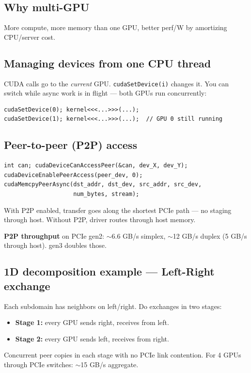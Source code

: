\documentclass[10pt]{article}
\begin{document}
\subsection*{Why multi-GPU}
More compute, more memory than one GPU, better perf/W by amortizing CPU/server cost.

\subsection*{Managing devices from one CPU thread}
CUDA calls go to the \emph{current} GPU. \texttt{cudaSetDevice(i)} changes it. You can switch while async work is in flight — both GPUs run concurrently:
\begin{lstlisting}
cudaSetDevice(0); kernel<<<...>>>(...);
cudaSetDevice(1); kernel<<<...>>>(...);  // GPU 0 still running
\end{lstlisting}

\subsection*{Peer-to-peer (P2P) access}
\begin{lstlisting}
int can; cudaDeviceCanAccessPeer(&can, dev_X, dev_Y);
cudaDeviceEnablePeerAccess(peer_dev, 0);
cudaMemcpyPeerAsync(dst_addr, dst_dev, src_addr, src_dev,
                    num_bytes, stream);
\end{lstlisting}
With P2P enabled, transfer goes along the shortest PCIe path — no staging through host. Without P2P, driver routes through host memory.

\begin{keybox}
\textbf{P2P throughput} on PCIe gen2: $\sim$6.6 GB/s simplex, $\sim$12 GB/s duplex (5 GB/s through host). gen3 doubles those.
\end{keybox}

\subsection*{1D decomposition example — Left-Right exchange}
Each subdomain has neighbors on left/right. Do exchanges in two stages:
\begin{itemize}
  \item \textbf{Stage 1:} every GPU sends right, receives from left.
  \item \textbf{Stage 2:} every GPU sends left, receives from right.
\end{itemize}
Concurrent peer copies in each stage with no PCIe link contention. For 4 GPUs through PCIe switches: $\sim$15 GB/s aggregate.
\end{document}

